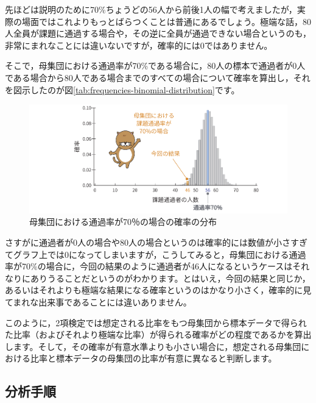 \documentclass[
  12pt,
  a5jpaper,
  lualatex, ja=standard]{bxjsbook}
\begin{document}
先ほどは説明のために70\%ちょうどの56人から前後1人の幅で考えましたが，実際の場面ではこれよりもっとばらつくことは普通にあるでしょう。極端な話，80人全員が課題に通過する場合や，その逆に全員が通過できない場合というのも，非常にまれなことには違いないですが，確率的には0ではありません。

そこで，母集団における通過率が70\%である場合に，80人の標本で通過者が0人である場合から80人である場合までのすべての場合について確率を算出し，それを図示したのが図\ref{tab:frequencies-binomial-distribution}です。

\begin{figure}[!ht]

{\centering \includegraphics[width=1\linewidth]{images/frequencies/binomial-distribution} 

}

\caption{母集団における通過率が70％の場合の確率の分布}\label{fig:frequencies-binomial-distribution}
\end{figure}

さすがに通過者が0人の場合や80人の場合というのは確率的には数値が小さすぎてグラフ上では0になってしまいますが，こうしてみると，母集団における通過率が70\%の場合に，今回の結果のように通過者が46人になるというケースはそれなりにありうることだというのがわかります。とはいえ，今回の結果と同じか，あるいはそれよりも極端な結果になる確率というのはかなり小さく，確率的に見てまれな出来事であることには違いありません。

このように，2項検定では想定される比率をもつ母集団から標本データで得られた比率（およびそれより極端な比率）が得られる確率がどの程度であるかを算出します。そして，その確率が有意水準よりも小さい場合に，想定される母集団における比率と標本データの母集団の比率が有意に異なると判断します。

\hypertarget{sub:frequencies-binomial-procedure}{%
\subsection{分析手順}\label{sub:frequencies-binomial-procedure}}
\end{document}
